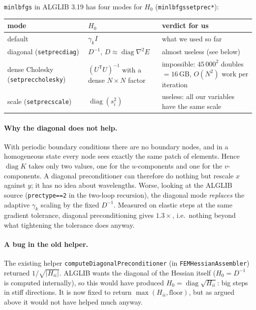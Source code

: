 \documentclass[11pt,a4paper]{article}
\theoremstyle{remark}
\newcommand{\T}{^{\mathsf T}}
\newcommand{\code}[1]{\texttt{#1}}
\begin{document}
\code{minlbfgs} in ALGLIB 3.19 has four modes for $H_0$
(\code{minlbfgssetprec*}):

\begin{center}
\begin{tabular}{p{3.3cm}p{4.6cm}p{5.3cm}}
\toprule
mode & $H_0$ & verdict for us\\
\midrule
default & $\gamma_kI$ & what we used so far\\
diagonal (\code{setprecdiag}) & $D^{-1}$, $D\approx\operatorname{diag}\nabla^2E$ & almost useless (see below)\\
dense Cholesky (\code{setpreccholesky}) & $(U\T U)^{-1}$ with a dense $N\times N$ factor & impossible: $45\,000^2$ doubles $=16$\,GB, $O(N^2)$ work per iteration\\
scale (\code{setprecscale}) & $\operatorname{diag}(s_i^2)$ & useless: all our variables have the same scale\\
\bottomrule
\end{tabular}
\end{center}

\paragraph{Why the diagonal does not help.} With periodic boundary conditions there are no
boundary nodes, and in a homogeneous state every node sees exactly the same patch of
elements. Hence $\operatorname{diag}K$ takes only two values, one for the $u$-components and
one for the $v$-components. A diagonal preconditioner can therefore do nothing but rescale
$x$ against $y$; it has no idea about wavelengths. Worse, looking at the ALGLIB source
(\code{prectype==2} in the two-loop recursion), the diagonal mode \emph{replaces} the
adaptive $\gamma_k$ scaling by the fixed $D^{-1}$. Measured on elastic steps at the same
gradient tolerance, diagonal preconditioning gives $1.3\times$, i.e.\ nothing beyond what
tightening the tolerance does anyway.

\paragraph{A bug in the old helper.} The existing helper
\code{computeDiagonalPreconditioner} (in \code{FEMHessianAssembler}) returned
$1/\sqrt{|H_{ii}|}$. ALGLIB wants the diagonal of the Hessian itself ($H_0=D^{-1}$ is
computed internally), so this would have produced $H_0=\operatorname{diag}\sqrt{H_{ii}}$:
big steps in stiff directions. It is now fixed to return $\max(H_{ii},\text{floor})$, but as
argued above it would not have helped much anyway.
\end{document}
